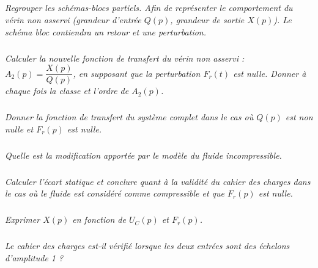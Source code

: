\documentclass[11pt,oneside]{article}
\begin{document}
{\begin{corrige}
\end{corrige}
}{}

\subparagraph{}
\textit{Regrouper les schémas-blocs partiels. Afin de représenter le comportement du vérin non asservi (grandeur d'entrée $Q(p)$, grandeur de sortie $X(p)$). Le schéma bloc contiendra un retour et une perturbation.}

\subparagraph{}
\textit{Calculer la nouvelle fonction de transfert du vérin non asservi : $A_2(p)=\dfrac{X(p)}{Q(p)}$, en supposant que la perturbation $F_r(t)$ est nulle. Donner à chaque fois la classe et l'ordre de $A_2(p)$.}

\subparagraph{}
\textit{Donner la fonction de transfert du système complet dans le cas où $Q(p)$ est non nulle et $F_r(p)$  est nulle.}

\subparagraph{}
\textit{Quelle est la modification apportée par le modèle du fluide incompressible.}

\subparagraph{}
\textit{Calculer l'écart statique et conclure quant à la validité du cahier des charges dans le cas où le fluide est considéré comme compressible et que $F_r(p)$ est nulle.}

\subparagraph{}
\textit{Exprimer $X(p)$ en fonction de $U_C(p)$ et $F_r(p)$.}

\subparagraph{}
\textit{Le cahier des charges est-il vérifié lorsque les deux entrées sont des échelons d'amplitude 1 ?}
\end{document}
